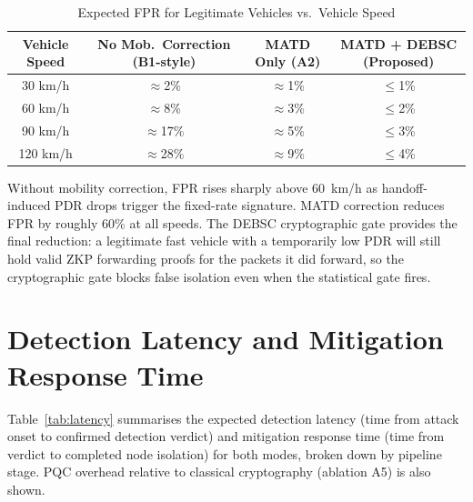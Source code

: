 \documentclass[12pt, a4paper]{report}
\begin{document}
\begin{table}[htbp]
\renewcommand{\arraystretch}{1.3}
\caption{Expected FPR for Legitimate Vehicles vs.\ Vehicle Speed}
\label{tab:fpr_vs_speed}
\centering
\scriptsize
\begin{tabular}{|c|c|c|c|}
\hline
\textbf{Vehicle Speed} &
\textbf{No Mob.\ Correction (B1-style)} &
\textbf{MATD Only (A2)} &
\textbf{MATD + DEBSC (Proposed)} \\
\hline
30 km/h  & $\approx$2\%  & $\approx$1\%  & $\leq$1\%  \\
60 km/h  & $\approx$8\%  & $\approx$3\%  & $\leq$2\%  \\
90 km/h  & $\approx$17\% & $\approx$5\%  & $\leq$3\%  \\
120 km/h & $\approx$28\% & $\approx$9\%  & $\leq$4\%  \\
\hline
\end{tabular}
\end{table}

Without mobility correction, FPR rises sharply above 60~km/h as handoff-induced
PDR drops trigger the fixed-rate signature. MATD correction reduces FPR by
roughly 60\% at all speeds. The DEBSC cryptographic gate provides the final
reduction: a legitimate fast vehicle with a temporarily low PDR will still hold
valid ZKP forwarding proofs for the packets it did forward, so the cryptographic
gate blocks false isolation even when the statistical gate fires.

\section{Detection Latency and Mitigation Response Time}

Table~\ref{tab:latency} summarises the expected detection latency (time from
attack onset to confirmed detection verdict) and mitigation response time (time
from verdict to completed node isolation) for both modes, broken down by
pipeline stage. PQC overhead relative to classical cryptography (ablation A5)
is also shown.
\end{document}
